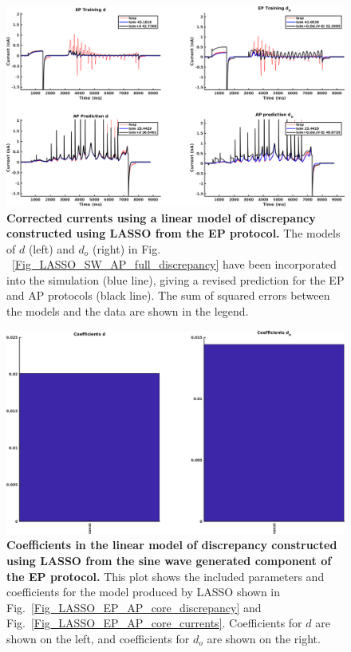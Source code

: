 \documentclass[11pt,a4paper,oneside]{article}
\begin{document}
\begin{figure}[hb]
\begin{center}
\includegraphics[scale=0.42]{Figures/LASSO_EP_AP_full_currents.png}
\caption{\textbf{Corrected currents using a linear model of discrepancy constructed using LASSO from the EP protocol.} The models of $d$ (left) and $d_o$ (right) in Fig. ~\ref{Fig_LASSO_SW_AP_full_discrepancy} have been incorporated into the simulation (blue line), giving a revised prediction for the EP and AP protocols (black line). The sum of squared errors between the models and the data are shown in the legend.}
\label{Fig_LASSO_EP_AP_full_currents}
\end{center}
\end{figure}

\clearpage

\begin{figure}[t]
\begin{center}
\includegraphics[scale=0.42]{Figures/LASSO_EP_AP_full_coefficients.png}
\caption{\textbf{Coefficients in the linear model of discrepancy constructed using LASSO from the sine wave generated component of the EP protocol.} This plot shows the included parameters and coefficients for the model produced by LASSO shown in Fig.~\ref{Fig_LASSO_EP_AP_core_discrepancy} and Fig.~\ref{Fig_LASSO_EP_AP_core_currents}. Coefficients for $d$ are shown on the left, and coefficients for $d_o$ are shown on the right.} 
\label{Fig_LASSO_EP_AP_core_coefficients}
\end{center}
\end{figure}
\end{document}
